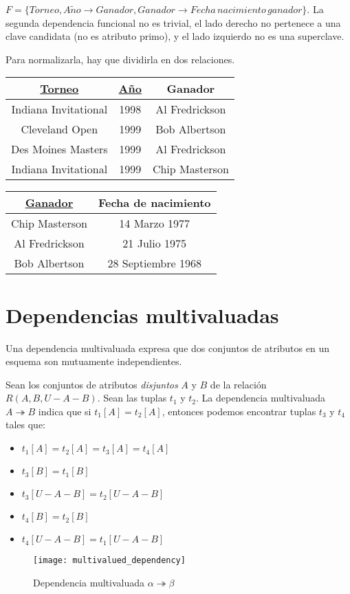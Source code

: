\documentclass[a4paper, twoside]{article}
\begin{document}
$F=\{Torneo,A\tilde{n}o\to Ganador,Ganador\to Fecha\, nacimiento\, ganador\}$.
La segunda dependencia funcional no es trivial, el lado derecho no
pertenece a una clave candidata (no es atributo primo), y el lado
izquierdo no es una superclave.

Para normalizarla, hay que dividirla en dos relaciones.

\begin{tabular}{|c|c|c|}
\hline 
\uline{Torneo} & \uline{Año} & Ganador\\
\hline 
\hline 
Indiana Invitational  & 1998 & Al Fredrickson \\
\hline 
Cleveland Open  & 1999 & Bob Albertson \\
\hline 
Des Moines Masters  & 1999 & Al Fredrickson \\
\hline 
Indiana Invitational  & 1999 & Chip Masterson \\
\hline 
\end{tabular}%
\begin{tabular}{|c|c|}
\hline 
\uline{Ganador} & Fecha de nacimiento\\
\hline 
\hline 
Chip Masterson  & 14 Marzo 1977\\
\hline 
Al Fredrickson  & 21 Julio 1975\\
\hline 
Bob Albertson  & 28 Septiembre 1968\\
\hline 
\end{tabular}


\section{Dependencias multivaluadas}

Una dependencia multivaluada expresa que dos conjuntos de atributos
en un esquema son mutuamente independientes.

Sean los conjuntos de atributos \emph{disjuntos} $A$ y $B$ de la
relación $R(A,B,U-A-B)$. Sean las tuplas $t_{1}$ y $t_{2}$. La
dependencia multivaluada $A\twoheadrightarrow B$ indica que si $t_{1}[A]=t_{2}[A]$,
entonces podemos encontrar tuplas $t_{3}$ y $t_{4}$ tales que:
\begin{itemize}
\item $t_{1}[A]=t_{2}[A]=t_{3}[A]=t_{4}[A]$
\item $t_{3}[B]=t_{1}[B]$
\item $t_{3}[U-A-B]=t_{2}[U-A-B]$
\item $t_{4}[B]=t_{2}[B]$
\item $t_{4}[U-A-B]=t_{1}[U-A-B]$
\end{itemize}
\begin{figure}[H]
\noindent \begin{centering}
\texttt{[image: multivalued\_dependency]}
\par\end{centering}

\protect\caption{Dependencia multivaluada $\alpha\twoheadrightarrow\beta$}
\end{figure}
\end{document}

